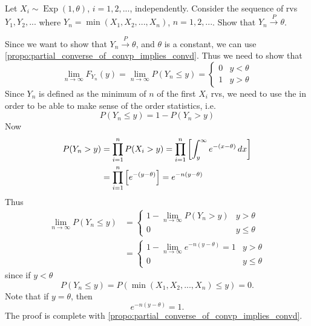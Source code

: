 \documentclass[notoc,notitlepage]{tufte-book}
\DeclareMathOperator{\Exp}{Exp }
\newcommand{\convp}{\overset{P}{\to}}
\begin{document}
\begin{eg}
  Let $X_i \sim \Exp(1, \theta)$, $i = 1, 2, ...$, independently. Consider the sequence of rvs $Y_1, Y_2, ...$ where $Y_n = \min(X_1, X_2, ..., X_n)$, $n = 1, 2, ...$. Show that $Y_n \convp \theta$.
\end{eg}

\begin{solution}
  Since we want to show that $Y_n \convp \theta$, and $\theta$ is a constant, we can use \cref{propo:partial_converse_of_convp_implies_convd}.
  Thus we need to show that
  \begin{equation*}
    \lim_{n \to \infty} F_{Y_n} (y) = \lim_{n \to \infty} P ( Y_n \leq y ) = \begin{cases}
      0 & y < \theta \\
      1 & y > \theta
    \end{cases}
  \end{equation*}
  Since $Y_n$ is defined as the minimum of $n$ of the first $X_i$ rvs, we need to use the  in order to be able to make sense of the order statistics, i.e.
  \begin{equation*}
    P( Y_n \leq y ) = 1 - P( Y_n > y )
  \end{equation*}
  Now
  \begin{align*}
    P( Y_n > y ) &= \prod_{i=1}^{n} P(X_i > y) = \prod_{i=1}^{n} \left[ \int_{y}^{\infty} e^{- ( x - \theta )} \mathop{}\!d{x} \right] \\
                 &= \prod_{i=1}^{n} \left[ e^{- (y - \theta)} \right] = e^{ -n (y - \theta) }
  \end{align*}
  Thus
  \begin{align*}
    \lim_{n \to \infty} P (Y_n \leq y) &= \begin{cases}
      1 - \lim\limits_{n \to \infty} P( Y_n > y ) & y > \theta \\
      0 & y \leq \theta
    \end{cases} \\
    &= \begin{cases}
       1 - \lim\limits_{n \to \infty} e^{-n (y - \theta)} = 1 & y > \theta \\
       0 & y \leq \theta
    \end{cases}
  \end{align*}
  since if $y < \theta$
  \begin{equation*}
    P( Y_n \leq y ) = P( \min( X_1, X_2, ..., X_n ) \leq y ) = 0.
  \end{equation*}
  Note that if $y = \theta$, then
  \begin{equation*}
    e^{-n ( y - \theta )} = 1.
  \end{equation*}
  The proof is complete with \cref{propo:partial_converse_of_convp_implies_convd}.
\end{solution}
\end{document}
